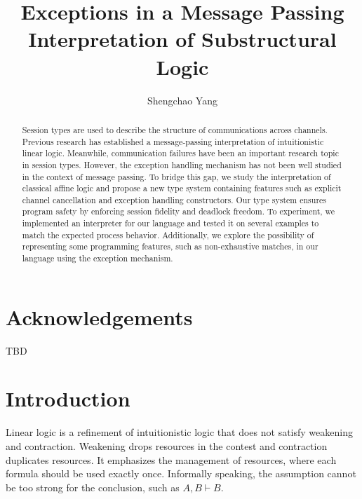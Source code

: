 \documentclass[12pt, openany]{memoir}
\begin{document}
\frontmatter

\pagestyle{empty}

\title{\textbf{Exceptions in a Message Passing Interpretation of Substructural Logic}}
\author{Shengchao Yang}


\maketitle

\pagestyle{nonumbers}

\begin{abstract}
  Session types are used to describe the structure of communications across channels. Previous research has established a message-passing interpretation of intuitionistic linear logic. 
  Meanwhile, communication failures have been an important research topic in session types. 
  However, the exception handling mechanism has not been well studied in the context of message passing. 
  To bridge this gap, we study the interpretation of classical affine logic and propose a new type system containing features such as explicit channel cancellation and exception handling constructors. 
  Our type system ensures program safety by enforcing session fidelity and deadlock freedom. 
  To experiment, we implemented an interpreter for our language and tested it on several examples to match the expected process behavior. 
  Additionally, we explore the possibility of representing some programming features, such as non-exhaustive matches, in our language using the exception mechanism.
\end{abstract}

\chapter{Acknowledgements}

TBD

\cleardoublepage
\tableofcontents

\mainmatter

\chapter{Introduction}

Linear logic \cite{Girard1987} is a refinement of intuitionistic logic that does not satisfy weakening and contraction. 
Weakening drops resources in the contest and contraction duplicates resources. 
It emphasizes the management of resources, where each formula should be used exactly once. 
Informally speaking, the assumption cannot be too strong for the conclusion, such as $A, B \vdash B$.
\end{document}
